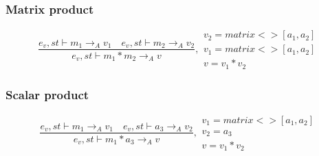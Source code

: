 \subsubsection{Matrix product}
\begin{equation}
	\frac { { e }_{ v },st\vdash { m }_{ 1 }{ \rightarrow  }_{ A }{ v }_{ 1 }\quad { e }_{ v },st\vdash { m }_{ 2 }{ \rightarrow  }_{ A }{ v }_{ 2 } }{ { e }_{ v },st\vdash { m }_{ 1 }\ast { m }_{ 2 }{ \rightarrow  }_{ A }{ v } } ,\begin{matrix} { v }_{ 2 }=matrix<>[{ a }_{ 1 },{ a }_{ 2 }] \\ { v }_{ 1 }=matrix<>[{ a }_{ 1 },{ a }_{ 2 }] \\ v={ v }_{ 1 }*{ v }_{ 2 } \end{matrix}
\end{equation}

\subsubsection{Scalar product}
\begin{equation}
	\frac { { e }_{ v },st\vdash { m }_{ 1 }{ \rightarrow  }_{ A }{ v }_{ 1 }\quad { e }_{ v },st\vdash { a }_{ 3 }{ \rightarrow  }_{ A }{ v }_{ 2 } }{ { e }_{ v },st\vdash { m }_{ 1 }\ast { a }_{ 3 }{ \rightarrow  }_{ A }{ v } } ,\begin{matrix} { v }_{ 1 }=matrix<>[{ a }_{ 1 },{ a }_{ 2 }] \\ { v }_{ 2 }={ a }_{ 3 } \\ v={ v }_{ 1 }*{ v }_{ 2 } \end{matrix}
\end{equation}

